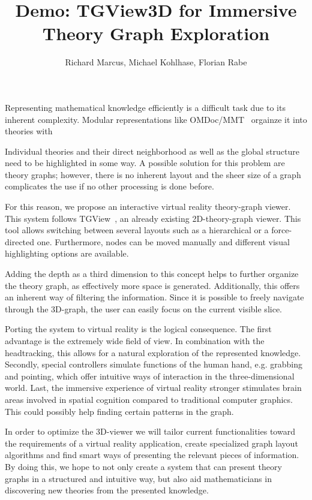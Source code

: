 \documentclass{llncs}
\title{Demo: TGView3D for Immersive Theory Graph Exploration}
\author{Richard Marcus, Michael Kohlhase, Florian Rabe}
\institute{Computer Science, FAU Erlangen-N\"urnberg}
\begin{document}
\maketitle

Representing mathematical knowledge efficiently is a difficult task due to its inherent complexity. Modular representations like OMDoc/MMT~\cite{Kohlhase:OMDoc1.2,RabKoh:WSMSML13} orgainze it into  theories with 

Individual theories and their direct neighborhood as well as the global structure need to be highlighted in some way. A possible solution for this problem are theory graphs; however, there is no inherent layout and the sheer size of a graph complicates the use if no other processing is done before.

For this reason, we propose an interactive virtual reality theory-graph viewer. This system follows TGView~\cite{RupKohMue:fitgv17}, an already existing 2D-theory-graph viewer. This tool allows switching between several layouts such as a hierarchical or a force-directed one. Furthermore, nodes can be moved manually and different visual highlighting options are available.

Adding the depth as a third dimension to this concept helps to further organize the theory graph, as effectively more space is generated. Additionally, this offers an inherent way of filtering the information. Since it is possible to freely navigate through the 3D-graph, the user can easily focus on the current visible slice.

Porting the system to virtual reality is the logical consequence. The first advantage is the extremely wide field of view. In combination with the headtracking, this allows for a natural exploration of the represented knowledge. Secondly, special controllers simulate functions of the human hand, e.g. grabbing and pointing, which offer intuitive ways of interaction in the three-dimensional world. Last, the immersive experience of virtual reality stronger stimulates brain areas involved in spatial cognition compared to traditional computer graphics. This could possibly help finding certain patterns in the graph.

In order to optimize the 3D-viewer we will tailor current functionalities toward the
requirements of a virtual reality application, create specialized graph layout algorithms
and find smart ways of presenting the relevant pieces of information. By doing this, we
hope to not only create a system that can present theory graphs in a structured and
intuitive way, but also aid mathematicians in discovering new theories from the presented
knowledge.

\printbibliography
\end{document}
